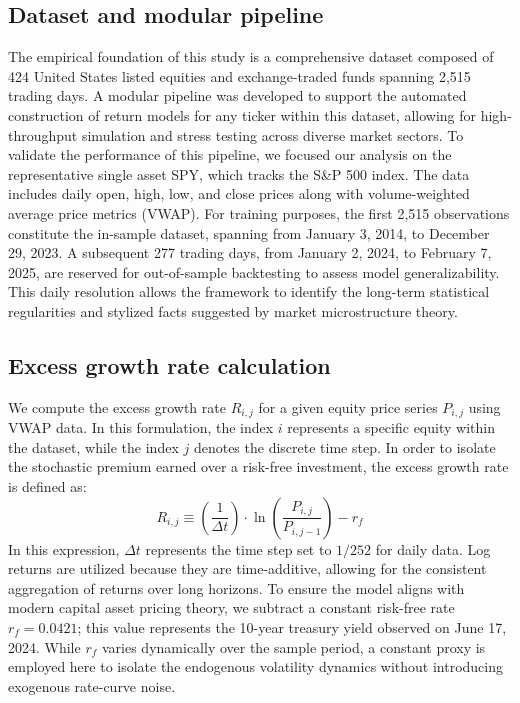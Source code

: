 \documentclass[11pt, letterpaper]{article}
\begin{document}
\subsection{Dataset and modular pipeline}
The empirical foundation of this study is a comprehensive dataset composed of 424 United States listed equities and exchange-traded funds spanning 2,515 trading days. A modular pipeline was developed to support the automated construction of return models for any ticker within this dataset, allowing for high-throughput simulation and stress testing across diverse market sectors. To validate the performance of this pipeline, we focused our analysis on the representative single asset SPY, which tracks the S\&P 500 index. The data includes daily open, high, low, and close prices along with volume-weighted average price metrics (VWAP). For training purposes, the first 2,515 observations constitute the in-sample dataset, spanning from January 3, 2014, to December 29, 2023. A subsequent 277 trading days, from January 2, 2024, to February 7, 2025, are reserved for out-of-sample backtesting to assess model generalizability. This daily resolution allows the framework to identify the long-term statistical regularities and stylized facts suggested by market microstructure theory.

\subsection{Excess growth rate calculation}

We compute the excess growth rate $R_{i,j}$ for a given equity price series $P_{i,j}$ using VWAP data. In this formulation, the index $i$ represents a specific equity within the dataset, while the index $j$ denotes the discrete time step. In order to isolate the stochastic premium earned over a risk-free investment, the excess growth rate is defined as:
\begin{equation}
    R_{i,j} \equiv \left( \frac{1}{\Delta t} \right) \cdot \ln \left( \frac{P_{i,j}}{P_{i,j-1}} \right) - r_f
    \label{eq:growth_rate}
\end{equation}
In this expression, $\Delta t$ represents the time step set to $1/252$ for daily data. Log returns are utilized because they are time-additive, allowing for the consistent aggregation of returns over long horizons. To ensure the model aligns with modern capital asset pricing theory, we subtract a constant risk-free rate $r_f = 0.0421$; this value represents the 10-year treasury yield observed on June 17, 2024. While $r_f$ varies dynamically over the sample period, a constant proxy is employed here to isolate the endogenous volatility dynamics without introducing exogenous rate-curve noise.
\end{document}
